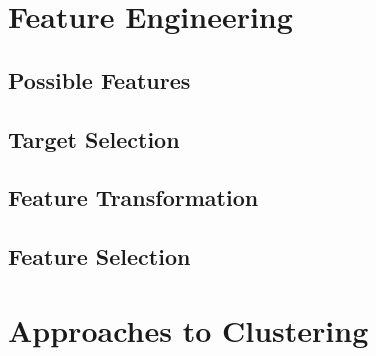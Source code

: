 \section{Feature Engineering}
\label{sec:chap6-feature-engineer}

\subsection{Possible Features}
\label{subsec:chap6-feature-select}

\subsection{Target Selection}
\label{subsec:chap6-feature-select}

\subsection{Feature Transformation}
\label{subsec:chap6-feature-transform}

\subsection{Feature Selection}
\label{subsec:chap6-litmus}


\section{Approaches to Clustering}
\label{sec:chap6-cluster}

